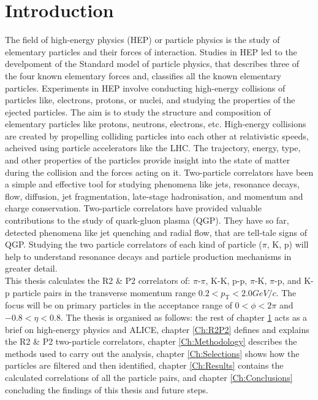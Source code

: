 \documentclass[12pt,a4paper,twoside]{report}
\begin{document}
\chapter{Introduction}\label{Ch:Introduction}
The field of high-energy physics (HEP) or particle physics is the study of elementary particles and their forces of interaction. Studies in HEP led to the develpoment of the Standard model of particle physics, that describes three of the four known elementary forces and, classifies all the known elementary particles. Experiments in HEP involve conducting high-energy collisions of particles like, electrons, protons, or nuclei, and studying the properties of the ejected particles. The aim is to study the structure and composition of elementary particles like protons, neutrons, electrons, etc. High-energy collisions are created by propelling colliding particles into each other at relativistic speeds, acheived using particle accelerators like the LHC. The trajectory, energy, type, and other properties of the particles provide insight into the state of matter during the collision and the forces acting on it. Two-particle correlators have been a simple and effective tool for studying phenomena like jets, resonance decays, flow, diffusion, jet fragmentation, late-stage hadronisation, and momentum and charge conservation. Two-particle correlators have provided valuable contributions to the study of quark-gluon plasma (QGP). They have so far, detected phenomena like jet quenching \cite{Ref:jetQ-paper1} \cite{Ref:jetQ-paper2} and radial flow\cite{Ref:flow-paper}, that are tell-tale signs of QGP. Studying the two particle correlators of each kind of particle ($\pi$, K, p) will help to understand resonance decays and particle production mechanisms in greater detail.\\

This thesis calculates the R2 \& P2 correlators of: $\pi$-$\pi$, K-K, p-p, $\pi$-K, $\pi$-p, and K-p particle pairs in the transverse momentum range $0.2<p_\mathrm{T}<2.0 GeV/c$. The focus will be on primary particles in the acceptance range of $0<\phi<2\pi$ and $-0.8<\eta<0.8$. The thesis is organised as follows: the rest of chapter \ref{Ch:Introduction} acts as a brief on high-energy physics and ALICE, chapter \ref{Ch:R2P2} defines and explains the R2 \& P2 two-particle correlators, chapter \ref{Ch:Methodology} describes the methods used to carry out the analysis, chapter \ref{Ch:Selections} shows how the particles are filtered and then identified, chapter \ref{Ch:Results} contains the calculated correlations of all the particle pairs, and chapter \ref{Ch:Conclusions} concluding the findings of this thesis and future steps.
\newpage
\end{document}
